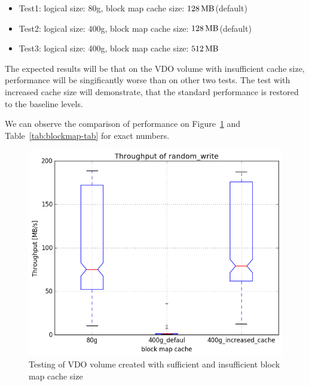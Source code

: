 \documentclass[
  color, %
  table, %
  lof,   %
  lot,   %
]{fithesis3}
\begin{document}

\begin{itemize}
    \item Test1: logical size: 80g, block map cache size: $\SI{128}{\mega\byte}$(default)
    \item Test2: logical size: 400g, block map cache size: $\SI{128}{\mega\byte}$(default)
    \item Test3: logical size: 400g, block map cache size: $\SI{512}{\mega\byte}$ 
\end{itemize}

The expected results will be that on the VDO volume with insufficient cache size, performance will be singificantly worse than on other two tests. The test with increased cache size will demonstrate, that the standard performance is restored to the baseline levels.

We can observe the comparison of performance on Figure~\ref{fig:blockmap-boxplots} and Table~\ref{tab:blockmap-tab} for exact numbers.

\begin{figure}
        \centering
        \includegraphics[width=\textwidth]{../results/block_map_cache/report/random_write1_compare_boxplots}
\caption[Block map cache size testing]{Testing of VDO volume created with sufficient and insufficient block map cache size}
\label{fig:blockmap-boxplots}
\end{figure}
\end{document}
